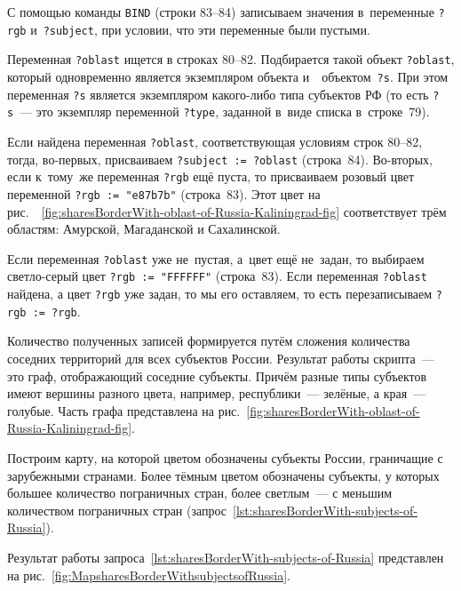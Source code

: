 С помощью команды \lstinline|BIND| (строки 83--84) 
записываем значения в~переменные \lstinline|?rgb| и~\mbox{\lstinline|?subject|}, 
при условии, что эти переменные были пустыми. 

Переменная \lstinline|?oblast| ищется в строках 80--82. 
Подбирается такой объект \lstinline|?oblast|, 
который одновременно является 
экземпляром объекта  
и~~объектом~\lstinline|?s|. 
При этом переменная \lstinline|?s| является экземпляром какого-либо типа субъектов РФ 
(то есть \lstinline|?s|~--- это экземпляр переменной \lstinline|?type|, 
заданной в~виде списка в~строке~79).

Если найдена переменная \lstinline|?oblast|, 
соответствующая условиям строк 80--82, 
тогда, во-первых, присваиваем \lstinline|?subject := ?oblast| (строка~84). 
Во-вторых, если к~тому~же переменная \lstinline|?rgb| ещё пуста, 
то присваиваем розовый цвет переменной \lstinline|?rgb := "e87b7b"| (строка~83). 
Этот цвет на рис.~\protect~\ref{fig:sharesBorderWith-oblast-of-Russia-Kaliningrad-fig} 
соответствует трём областям: Амурской, Магаданской и Сахалинской. 

Если переменная \lstinline|?oblast| уже не~пустая, а~цвет ещё не~задан, 
то выбираем светло-серый цвет \lstinline|?rgb := "FFFFFF"| (строка~83).
Если переменная \lstinline|?oblast| найдена, а цвет \lstinline|?rgb| уже задан, 
то мы его оставляем, то есть перезаписываем \lstinline|?rgb := ?rgb|.

Количество полученных записей формируется путём сложения количества соседних территорий для всех субъектов России. 
Результат работы скрипта~--- это граф, 
отображающий соседние субъекты. 
Причём разные типы субъектов имеют вершины разного цвета, например, 
республики~--- зелёные, а края~--- голубые. 
Часть графа представлена на рис.~\ref{fig:sharesBorderWith-oblast-of-Russia-Kaliningrad-fig}.%




\newpage
Построим карту, на которой цветом обозначены субъекты России, 
граничащие с зарубежными странами. 
Более тёмным цветом обозначены субъекты, у которых большее количество пограничных стран, 
более светлым~--- с меньшим количеством пограничных стран (запрос~\ref{lst:sharesBorderWith-subjects-of-Russia}).

Результат работы запроса~\ref{lst:sharesBorderWith-subjects-of-Russia} 
представлен на рис.~\ref{fig:MapsharesBorderWithsubjectsofRussia}.


